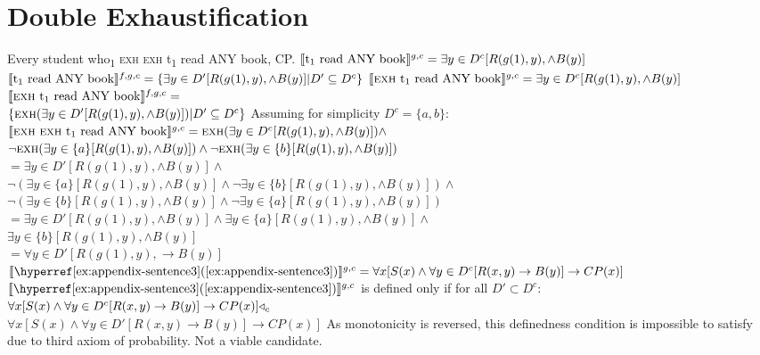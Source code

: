 \section{Double Exhaustification}
\pex
\a Every student who\textsubscript{1} {\scshape exh} {\scshape exh} t\textsubscript{1} read \MakeUppercase{any} book, CP.
\a $\intension[g,c]{t\textsubscript{1} read ANY book}=\exists{y\in D^c}[R(g(1),y),\land B(y)]$
\a $\intension[f,g,c]{t\textsubscript{1} read ANY book}=\{\exists{y\in D'}[R(g(1),y),\land B(y)]|D'\subseteq D^c\}$
\a $\intension[g,c]{{\scshape exh} t\textsubscript{1} read ANY book}=\exists{y\in D^c}[R(g(1),y),\land B(y)]$
\a $\intension[f,g,c]{{\scshape exh} t\textsubscript{1} read ANY book}=$\\\emptyfill$\{\predicate{exh}(\exists{y\in D'}[R(g(1),y),\land B(y)])|D'\subseteq D^c\}$
\a Assuming for simplicity $D^c=\{a,b\}$:\\$\intension[g,c]{{\scshape exh} {\scshape exh} t\textsubscript{1} read ANY book}=\predicate{exh}(\exists{y\in D^c}[R(g(1),y),\land B(y)])\land$\\$\neg\predicate{exh}(\exists{y\in \{a\}}[R(g(1),y),\land B(y)])\land\neg\predicate{exh}(\exists{y\in \{b\}}[R(g(1),y),\land B(y)])$\\
$=\exists{y\in D'}[R(g(1),y),\land B(y)]\land$\\\emptyfill$\neg(\exists{y\in\{a\}}[R(g(1),y),\land B(y)]\land\neg\exists{y\in\{b\}}[R(g(1),y),\land B(y)])\land$\\\emptyfill$\neg(\exists{y\in\{b\}}[R(g(1),y),\land B(y)]\land\neg\exists{y\in\{a\}}[R(g(1),y),\land B(y)])\phantom{\land}$\\
$=\exists{y\in D'}[R(g(1),y),\land B(y)]\land\exists{y\in\{a\}}[R(g(1),y),\land B(y)]\land$\\\emptyfill$\exists{y\in\{b\}}[R(g(1),y),\land B(y)]$\\
$=\forall{y\in D'}[R(g(1),y),\rightarrow B(y)]$
\a $\intension[g,c]{\refex{appendix-sentence3}}=\forall{x}[S(x)\land\forall{y\in D^c}[R(x,y)\rightarrow B(y)]\rightarrow CP(x)]$
\a $\intension[g,c]{\refex{appendix-sentence3}}$ is defined only if for all $D'\subset D^c$:\\$\forall{x}[S(x)\land\forall{y\in D^c}[R(x,y)\rightarrow B(y)]\rightarrow CP(x)]\lprob_c$\\\emptyfill$\forall{x}[S(x)\land\forall{y\in D'}[R(x,y)\rightarrow B(y)]\rightarrow CP(x)]$
\xe
As monotonicity is reversed, this definedness condition is impossible to satisfy due to  third axiom of probability. Not a viable candidate.

